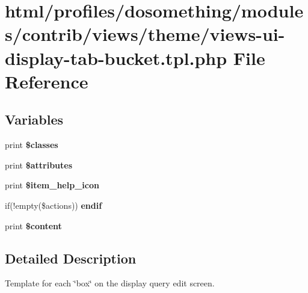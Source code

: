 \hypertarget{views-ui-display-tab-bucket_8tpl_8php}{
\section{html/profiles/dosomething/modules/contrib/views/theme/views-\/ui-\/display-\/tab-\/bucket.tpl.php File Reference}
\label{views-ui-display-tab-bucket_8tpl_8php}
}
\subsection*{Variables}
\begin{DoxyCompactItemize}
\item 
\hypertarget{views-ui-display-tab-bucket_8tpl_8php_a6d48ecbdbc70ca1812e665169b5fa1e2}{
print {\bfseries \$classes}}
\label{views-ui-display-tab-bucket_8tpl_8php_a6d48ecbdbc70ca1812e665169b5fa1e2}

\item 
\hypertarget{views-ui-display-tab-bucket_8tpl_8php_a9c88c4272fa40546577b45392a0b3cd3}{
print {\bfseries \$attributes}}
\label{views-ui-display-tab-bucket_8tpl_8php_a9c88c4272fa40546577b45392a0b3cd3}

\item 
\hypertarget{views-ui-display-tab-bucket_8tpl_8php_ad6c727d3ffb5dafddd4630f853adc96b}{
print {\bfseries \$item\_\-help\_\-icon}}
\label{views-ui-display-tab-bucket_8tpl_8php_ad6c727d3ffb5dafddd4630f853adc96b}

\item 
\hypertarget{views-ui-display-tab-bucket_8tpl_8php_ade91bc69a503a5ab88f3fdb968225b63}{
if(!empty(\$actions)) {\bfseries endif}}
\label{views-ui-display-tab-bucket_8tpl_8php_ade91bc69a503a5ab88f3fdb968225b63}

\item 
\hypertarget{views-ui-display-tab-bucket_8tpl_8php_ab7b7210f43aa78e34f0b202de894a74c}{
print {\bfseries \$content}}
\label{views-ui-display-tab-bucket_8tpl_8php_ab7b7210f43aa78e34f0b202de894a74c}

\end{DoxyCompactItemize}


\subsection{Detailed Description}
Template for each \char`\"{}box\char`\"{} on the display query edit screen. 